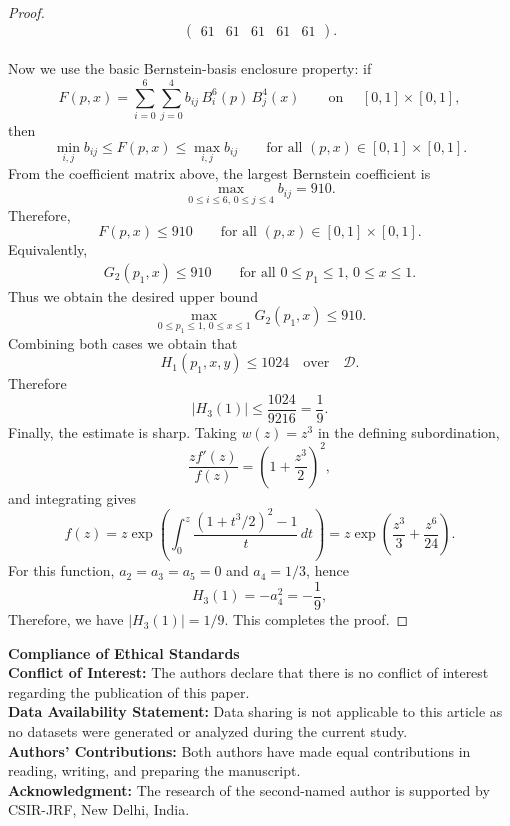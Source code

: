 \documentclass[a4paper,12pt,reqno]{amsart} %
\numberwithin{equation}{section}
\theoremstyle{definition}
\begin{document}
\begin{proof}
\[\begin{pmatrix}
	61 & 61 & 61 & 61 & 61
\end{pmatrix}.
\]\\
Now we use the basic Bernstein-basis enclosure property: if
\[
F(p,x)=\sum_{i=0}^{6}\sum_{j=0}^{4} b_{ij}\,B_i^6(p)\,B_j^4(x)
\qquad \text{on }\quad  [0,1]\times[0, 1],
\]
then
\[
\min_{i,j} b_{ij}\le F(p,x)\le \max_{i,j} b_{ij}
\qquad \text{for all } (p,x)\in[0,1]\times[0, 1].
\]
From the coefficient matrix above, the largest Bernstein coefficient is
\[
\max_{0\le i\le 6,\,0\le j\le 4} b_{ij}=910.
\]
Therefore,
\[
F(p,x)\le 910
\qquad \text{for all } (p,x)\in[0,1]\times[0, 1].
\]
Equivalently,
\begin{align*}
	G_2(p_1,x)\le 910
	\qquad \text{for all } 0\le p_1\le 1,\,0\le x\le 1.
\end{align*}
Thus we obtain the desired upper bound
\[
\max_{0\le p_1\le 1,\,0\le x\le 1} G_2(p_1,x)\le 910.
\]
Combining both cases we obtain that 
\[
H_{1}(p_1, x, y)\le 1024 \quad \text{over} \quad \mathcal{D}.
\]
Therefore 
\[
|H_{3}(1)|\le \frac{1024}{9216}=\frac{1}{9}.
\]
Finally, the estimate is sharp. Taking $w(z)=z^3$ in the defining subordination,
\[
\frac{z f'(z)}{f(z)}=\left(1+\frac{z^3}{2}\right)^2,
\]
and integrating gives
\[
f(z)=z\exp\!\left(\int_0^z \frac{(1+t^3/2)^2-1}{t}\,dt\right)
=z\exp\!\left(\frac{z^3}{3}+\frac{z^6}{24}\right).
\]
For this function, $a_2=a_3=a_5=0$ and $a_4=1/3$, hence
\[
H_3(1)=-a_4^2=-\frac19,
\]
Therefore, we have $|H_3(1)|=1/9$. This completes the proof.
\end{proof}
\vspace{4mm}
\noindent\textbf{Compliance of Ethical Standards}\\[2mm]
\noindent\textbf{Conflict of Interest:}
The authors declare that there is no conflict of interest regarding the publication of this paper.\\[2mm]
\noindent\textbf{Data Availability Statement:}
Data sharing is not applicable to this article as no datasets were generated or analyzed during the current study.\\[2mm]
\noindent\textbf{Authors' Contributions:}
Both authors have made equal contributions in reading, writing, and preparing the manuscript.\\[1mm]
\noindent\textbf{Acknowledgment:}
The research of the second-named author is supported by CSIR-JRF, New Delhi, India.
\end{document}
